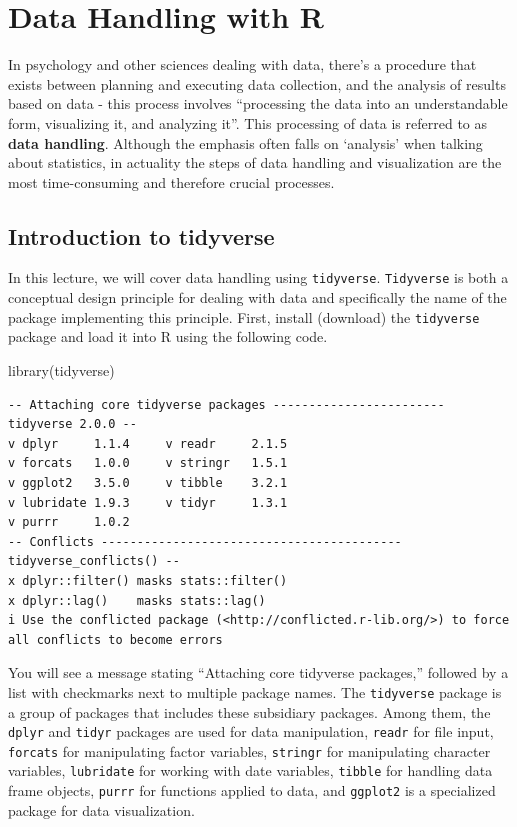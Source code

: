 \documentclass[
  a4paper,
]{book}
\newenvironment{Shaded}{\begin{snugshade}}{\end{snugshade}}
\newcommand{\FunctionTok}[1]{\textcolor[rgb]{0.28,0.35,0.67}{#1}}
\newcommand{\NormalTok}[1]{\textcolor[rgb]{0.00,0.23,0.31}{#1}}
\begin{document}

\chapter{Data Handling with R}\label{data-handling-with-r}

In psychology and other sciences dealing with data, there's a procedure
that exists between planning and executing data collection, and the
analysis of results based on data - this process involves ``processing
the data into an understandable form, visualizing it, and analyzing
it''. This processing of data is referred to as \textbf{data handling}.
Although the emphasis often falls on `analysis' when talking about
statistics, in actuality the steps of data handling and visualization
are the most time-consuming and therefore crucial processes.

\section{Introduction to tidyverse}\label{introduction-to-tidyverse}

In this lecture, we will cover data handling using \texttt{tidyverse}.
\texttt{Tidyverse} is both a conceptual design principle for dealing
with data and specifically the name of the package implementing this
principle. First, install (download) the \texttt{tidyverse} package and
load it into R using the following code.

\begin{Shaded}
\begin{Highlighting}[]
\FunctionTok{library}\NormalTok{(tidyverse)}
\end{Highlighting}
\end{Shaded}

\begin{verbatim}
-- Attaching core tidyverse packages ------------------------ tidyverse 2.0.0 --
v dplyr     1.1.4     v readr     2.1.5
v forcats   1.0.0     v stringr   1.5.1
v ggplot2   3.5.0     v tibble    3.2.1
v lubridate 1.9.3     v tidyr     1.3.1
v purrr     1.0.2     
-- Conflicts ------------------------------------------ tidyverse_conflicts() --
x dplyr::filter() masks stats::filter()
x dplyr::lag()    masks stats::lag()
i Use the conflicted package (<http://conflicted.r-lib.org/>) to force all conflicts to become errors
\end{verbatim}

You will see a message stating ``Attaching core tidyverse packages,''
followed by a list with checkmarks next to multiple package names. The
\texttt{tidyverse} package is a group of packages that includes these
subsidiary packages. Among them, the \texttt{dplyr} and \texttt{tidyr}
packages are used for data manipulation, \texttt{readr} for file input,
\texttt{forcats} for manipulating factor variables, \texttt{stringr} for
manipulating character variables, \texttt{lubridate} for working with
date variables, \texttt{tibble} for handling data frame objects,
\texttt{purrr} for functions applied to data, and \texttt{ggplot2} is a
specialized package for data visualization.
\end{document}

